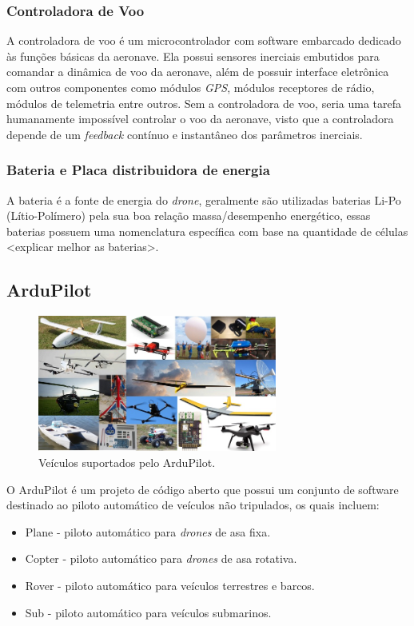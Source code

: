 \documentclass[12pt,a4paper,oneside]{book}
\begin{document}
\subsubsection*{Controladora de Voo}

A controladora de voo é um microcontrolador com software embarcado dedicado às funções básicas da aeronave. Ela possui sensores 
inerciais embutidos para comandar a dinâmica de voo da aeronave, além de possuir interface eletrônica com outros componentes como módulos \textit{GPS}, módulos receptores de rádio, módulos de telemetria entre outros. Sem a controladora de voo, seria uma tarefa humanamente impossível controlar o voo da aeronave, visto que a controladora depende de um \textit{feedback} contínuo e instantâneo dos parâmetros inerciais. 

\subsubsection*{Bateria e Placa distribuidora de energia}

A bateria é a fonte de energia do \textit{drone}, geralmente são utilizadas baterias Li-Po (Lítio-Polímero) pela sua boa relação massa/desempenho 
energético, essas baterias possuem uma nomenclatura específica com base na quantidade de células <explicar melhor as baterias>.

\subsection{ArduPilot}
%
\begin{figure}[!htbp]
  \centering
  \includegraphics[width=0.7\textwidth]{Images/introducao/ardupilot_vehicles.jpg}
  \caption{Veículos suportados pelo ArduPilot.}
  \label{fig:ardupilot_vehicles.jpg.0}
\end{figure}
%

O ArduPilot é um projeto de código aberto que possui um conjunto de software destinado ao piloto automático de veículos não tripulados, os quais incluem:
\begin{itemize}
  \item Plane - piloto automático para \textit{drones} de asa fixa.
  \item Copter - piloto automático para \textit{drones} de asa rotativa.
  \item Rover - piloto automático para veículos terrestres e barcos.
  \item Sub - piloto automático para veículos submarinos.
\end{itemize}
\end{document}
